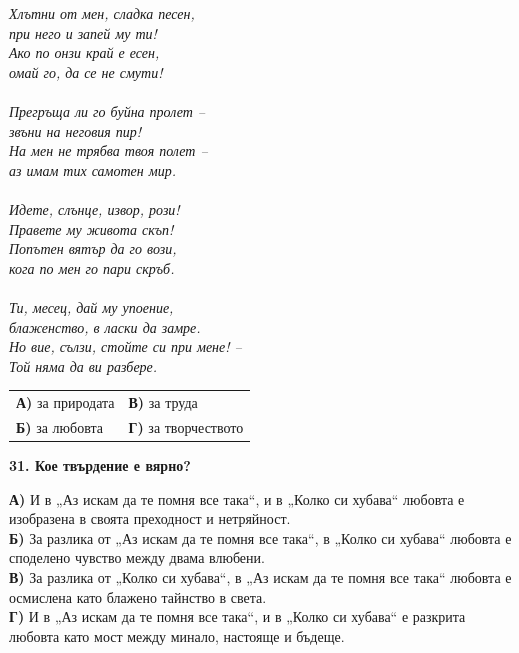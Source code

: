 \documentclass[12pt,a4paper]{article}
\begin{document}
\noindent
\textit{Хлътни от мен, сладка песен,\\
при него и запей му ти!\\
Ако по онзи край е есен,\\
омай го, да се не смути!\\
\\
Прегръща ли го буйна пролет --\\
звъни на неговия пир!\\
На мен не трябва твоя полет --\\
аз имам тих самотен мир.\\
\\
Идете, слънце, извор, рози!\\
Правете му живота скъп!\\
Попътен вятър да го вози,\\
кога по мен го пари скръб.\\
\\
Ти, месец, дай му упоение,\\
блаженство, в ласки да замре.\\
Но вие, сълзи, стойте си при мене! --\\
Той няма да ви разбере.}

\vspace{0.3cm}

\noindent
\begin{tabular}{@{}p{} p{}@{}}
\textbf{А)} за природата & \textbf{В)} за труда \\
\textbf{Б)} за любовта & \textbf{Г)} за творчеството
\end{tabular}

\vspace{0.6cm}

\noindent
\textbf{31. Кое твърдение е вярно?}

\vspace{0.2cm}

\noindent
\textbf{А)} И в „Аз искам да те помня все така“, и в „Колко си хубава“ любовта е изобразена в своята преходност и нетряйност.
\\
\noindent
\textbf{Б)} За разлика от „Аз искам да те помня все така“, в „Колко си хубава“ любовта е споделено чувство между двама влюбени.
\\
\noindent
\textbf{В)} За разлика от „Колко си хубава“, в „Аз искам да те помня все така“ любовта е осмислена като блажено тайнство в света.
\\
\noindent
\textbf{Г)} И в „Аз искам да те помня все така“, и в „Колко си хубава“ е разкрита любовта като мост между минало, настояще и бъдеще.
\end{document}

